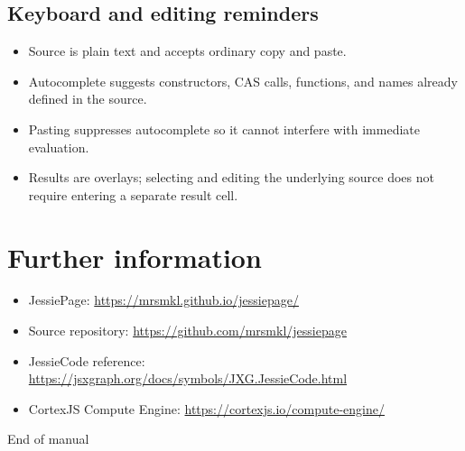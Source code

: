 \documentclass[11pt,a4paper]{article}
\begin{document}
\subsection{Keyboard and editing reminders}

\begin{itemize}
  \item Source is plain text and accepts ordinary copy and paste.
  \item Autocomplete suggests constructors, CAS calls, functions, and names already defined in the source.
  \item Pasting suppresses autocomplete so it cannot interfere with immediate evaluation.
  \item Results are overlays; selecting and editing the underlying source does not require entering a separate result cell.
\end{itemize}

\section{Further information}

\begin{itemize}
  \item JessiePage: \url{https://mrsmkl.github.io/jessiepage/}
  \item Source repository: \url{https://github.com/mrsmkl/jessiepage}
  \item JessieCode reference: \url{https://jsxgraph.org/docs/symbols/JXG.JessieCode.html}
  \item CortexJS Compute Engine: \url{https://cortexjs.io/compute-engine/}
\end{itemize}

\vfill
\begin{center}
  \color{muted}\small End of manual
\end{center}
\end{document}
